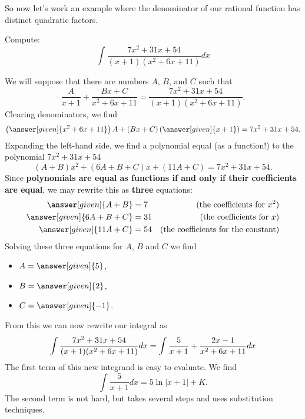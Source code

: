 \documentclass{ximera}
\begin{document}
So now let's work an example where the denominator of our rational
function has distinct quadratic factors.

\begin{example}
  Compute:
  \[
  \int\frac{7x^2+31x+54}{(x+1)(x^2+6x+11)}dx
  \]
  \begin{explanation}
    We will suppose that there are numbers $A$, $B$, and $C$ such that
    \[
    \frac{A}{x+1} + \frac{Bx+C}{x^2+6x+11} = \frac{7x^2+31x+54}{(x+1)(x^2+6x+11)}.
    \]
    Clearing denominators, we find
    \[
    \left(\answer[given]{x^2+6x+11}\right)A + (Bx+C)\left(\answer[given]{x+1}\right) = 7x^2+31x+54.
    \]
    Expanding the left-hand side, we find a polynomial equal (as a
    function!) to the polynomial $7x^2+31x+54$
    \[
    (A+B)x^2 + (6A+B+C)x + (11A+C) = 7x^2+31x+54.
    \]
    Since \textbf{polynomials are equal as functions if and only if
      their coefficients are equal}, we may rewrite this as
    \textbf{three} equations:
    \begin{align*}
      \answer[given]{A+B} &= 7 &\text{(the coefficients for $x^2$)}\\
      \answer[given]{6A+B+C} &= 31 &\text{(the coefficients for $x$)}\\
      \answer[given]{11A+C} &= 54 &\text{(the coefficients for the constant)}
    \end{align*}
    Solving these three equations for $A$, $B$ and $C$ we find
    \begin{itemize}
    \item $A = \answer[given]{5}$,
    \item $B = \answer[given]{2}$,
    \item $C = \answer[given]{-1}$.
    \end{itemize}
    From this we can now rewrite our integral as
    \[
    \int\frac{7x^2+31x+54}{(x+1)(x^2+6x+11)}dx = \int\frac{5}{x+1} + \frac{2x-1}{x^2+6x+11} dx\\
    \]
    The first term of this new integrand is easy to evaluate. We find
    \[
    \int \frac{5}{x+1} dx = 5\ln|x+1|+K.
    \]
    The second term is not hard, but takes several steps and uses
    substitution techniques.


\end{explanation}
\end{example}
\end{document}
